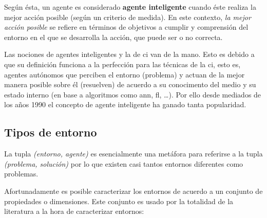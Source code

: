 Según ésta, un agente es considerado \textbf{agente inteligente} cuando éste realiza la mejor acción posible (según un criterio de medida). En este contexto, \textit{la mejor acción posible} se refiere en términos de objetivos a cumplir y comprensión del entorno en el que se desarrolla la acción, que puede ser o no correcta.

Las nociones de agentes inteligentes y la de \gls{ci} van de la mano. Esto es debido a que su definición funciona a la perfección para las técnicas de la \gls{ci}, esto es, agentes autónomos que perciben el entorno (problema) y actuan de la mejor manera posible sobre él (resuelven) de acuerdo a su conocimento del medio y su estado interno (en base a algoritmos como \gls{ann}, \gls{fl}, \ldots). Por ello desde mediados de los años 1990 el concepto de agente inteligente ha ganado tanta popularidad.

\subsection{Tipos de entorno}

La tupla \textit{(entorno, agente)} es esencialmente una metáfora para referirse a la tupla \textit{(problema, solución)} por lo que existen casi tantos entornos diferentes como problemas.

Afortunadamente es posible caracterizar los entornos de acuerdo a un conjunto de propiedades o dimensiones. Este conjunto es usado por la totalidad de la literatura a la hora de caracterizar entornos:

